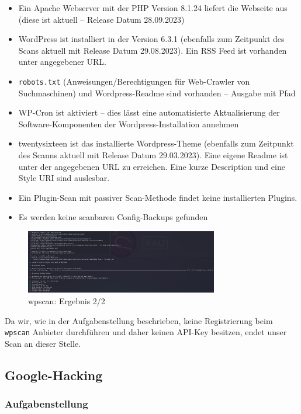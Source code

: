 \documentclass{article}
\begin{document}
\begin{itemize}
	\item Ein Apache Webserver mit der PHP Version 8.1.24 liefert die Webseite aus (diese ist aktuell – Release Datum 28.09.2023)
	\item WordPress ist installiert in der Version 6.3.1 (ebenfalls zum Zeitpunkt des Scans 
		aktuell mit Release Datum 29.08.2023). Ein RSS Feed ist vorhanden unter angegebener 
		URL.
	\item \texttt{robots.txt} (Anweisungen/Berechtigungen für Web-Crawler von Suchmaschinen) 
		und Wordpress-Readme sind vorhanden – Ausgabe mit Pfad
	\item WP-Cron ist aktiviert – dies lässt eine automatisierte Aktualisierung der Software-Komponenten der Wordpress-Installation annehmen
	\item twentysixteen ist das installierte Wordpress-Theme (ebenfalls zum Zeitpunkt des Scanns aktuell mit Release Datum 29.03.2023). Eine eigene Readme ist unter der angegebenen URL zu erreichen. Eine kurze Description und eine Style URI sind auslesbar.
	\item Ein Plugin-Scan mit passiver Scan-Methode findet keine installierten Plugins.
	\item Es werden keine scanbaren Config-Backups gefunden
\end{itemize}

\begin{figure}[H]
	\includegraphics[width=0.75\textwidth]{images/14}
	\centering
	\caption{wpscan: Ergebnis 2/2}
\end{figure}

Da wir, wie in der Aufgabenstellung beschrieben, keine Registrierung beim \texttt{wpscan}
Anbieter durchführen und daher keinen API-Key besitzen, endet unser Scan an dieser Stelle.

\newpage

\subsection{Google-Hacking}

\subsubsection*{Aufgabenstellung}
\end{document}
